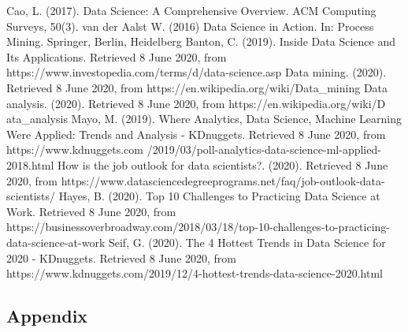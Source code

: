 \documentclass[a4paper, 11pt,twoside=true]{scrartcl}
\begin{document}
\begin{thebibliography}{99}
	Cao, L. (2017). Data Science: A Comprehensive Overview. ACM Computing Surveys, 50(3).
	van der Aalst W. (2016) Data Science in Action. In: Process Mining. Springer, Berlin, Heidelberg
	Banton, C. (2019). Inside Data Science and Its Applications. Retrieved 8 June 2020, from https://www.investopedia.com/terms/d/data-science.asp
	Data mining. (2020). Retrieved 8 June 2020, from https://en.wikipedia.org/wiki/Data\_mining
	Data analysis. (2020). Retrieved 8 June 2020, from https://en.wikipedia.org/wiki/D
	ata\_analysis
	Mayo, M. (2019). Where Analytics, Data Science, Machine Learning Were Applied:
	Trends and Analysis - KDnuggets. Retrieved 8 June 2020, from https://www.kdnuggets.com
	/2019/03/poll-analytics-data-science-ml-applied-2018.html
	How is the job outlook for data scientists?. (2020). Retrieved 8 June 2020, from https://www.datasciencedegreeprograms.net/faq/job-outlook-data-scientists/
	Hayes, B. (2020). Top 10 Challenges to Practicing Data Science at Work. Retrieved 8 June 2020, from https://businessoverbroadway.com/2018/03/18/top-10-challenges-to-practicing-data-science-at-work
	Seif, G. (2020). The 4 Hottest Trends in Data Science for 2020 - KDnuggets. Retrieved 8 June 2020, from https://www.kdnuggets.com/2019/12/4-hottest-trends-data-science-2020.html
\end{thebibliography}

\newpage
\subsection*{Appendix}
\end{document}
